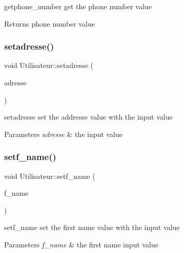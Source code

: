 getphone\+\_\+number get the phone number value 

\begin{DoxyReturn}{Returns}
phone number value 
\end{DoxyReturn}
\mbox{\label{class_utilisateur_a7047623a06539a397d1457d312985ba7}} 
\subsubsection{\texorpdfstring{setadresse()}{setadresse()}}
{\footnotesize\ttfamily void Utilisateur\+::setadresse (\begin{DoxyParamCaption}\item[{Q\+String}]{adresse }\end{DoxyParamCaption})}



setadresse set the addresse value with the input value 


\begin{DoxyParams}{Parameters}
{\em adresse} & the input value \\
\hline
\end{DoxyParams}
\mbox{\label{class_utilisateur_a79e3806e0aa6f5d263d03870621d3e59}} 
\subsubsection{\texorpdfstring{setf\_name()}{setf\_name()}}
{\footnotesize\ttfamily void Utilisateur\+::setf\+\_\+name (\begin{DoxyParamCaption}\item[{Q\+String}]{f\+\_\+name }\end{DoxyParamCaption})}



setf\+\_\+name set the first name value with the input value 


\begin{DoxyParams}{Parameters}
{\em f\+\_\+name} & the first name input value \\
\hline
\end{DoxyParams}
\mbox{\label{class_utilisateur_ac3d130b027779c9aaaf55fab9a62ace6}} 
